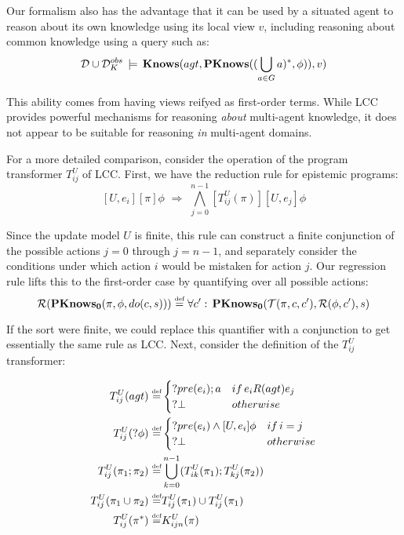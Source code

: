 Our formalism also has the advantage that it can be used by a situated
agent to reason about its own knowledge using its local view $v$,
including reasoning about common knowledge using a query such as:\[
\mathcal{D}\cup\mathcal{D}_{K}^{obs}\,\models\,\mathbf{Knows}(agt,\mathbf{PKnows}((\bigcup_{a\in G}a)^{*},\phi)),v)\]


This ability comes from having views reifyed as first-order terms.
While LCC provides powerful mechanisms for reasoning \emph{about}
multi-agent knowledge, it does not appear to be suitable for reasoning
\emph{in} multi-agent domains.

For a more detailed comparison, consider the operation of the program
transformer $T_{ij}^{U}$ of LCC. First, we have the reduction rule
for epistemic programs:\[
[U,e_{i}][\pi]\phi\,\,\Rightarrow\,\,\bigwedge_{j=0}^{n-1}[T_{ij}^{U}(\pi)][U,e_{j}]\phi\]


Since the update model $U$ is finite, this rule can construct a finite
conjunction of the possible actions $j=0$ through $j=n-1$, and separately
consider the conditions under which action $i$ would be mistaken
for action $j$. Our regression rule lifts this to the first-order
case by quantifying over all possible actions:\[
\mathcal{R}(\mathbf{PKnows_{0}}(\pi,\phi,do(c,s)))\stackrel{\mbox{\tiny def}}{=}\forall c':\,\mathbf{PKnows_{0}}(\mathcal{T}(\pi,c,c'),\mathcal{R}(\phi,c'),s)\]


If the sort were finite, we could replace this quantifier
with a conjunction to get essentially the same rule as LCC. Next,
consider the definition of the $T_{ij}^{U}$ transformer:

\begin{align*}
T_{ij}^{U}(agt)\stackrel{\mbox{\tiny def}}{=} & \begin{cases}
?pre(e_{i});a & if\, e_{i}R(agt)e_{j}\\
?\bot & otherwise\end{cases}\\
T_{ij}^{U}(?\phi)\stackrel{\mbox{\tiny def}}{=} & \begin{cases}
?pre(e_{i})\wedge[U,e_{i}]\phi & if\, i=j\\
?\bot & otherwise\end{cases}\\
T_{ij}^{U}(\pi_{1};\pi_{2})\stackrel{\mbox{\tiny def}}{=} & \bigcup_{k=0}^{n-1}(T_{ik}^{U}(\pi_{1});T_{kj}^{U}(\pi_{2}))\\
T_{ij}^{U}(\pi_{1}\cup\pi_{2})\stackrel{\mbox{\tiny def}}{=} & T_{ij}^{U}(\pi_{1})\cup T_{ij}^{U}(\pi_{1})\\
T_{ij}^{U}(\pi^{*})\stackrel{\mbox{\tiny def}}{=} & K_{ijn}^{U}(\pi)\end{align*}


